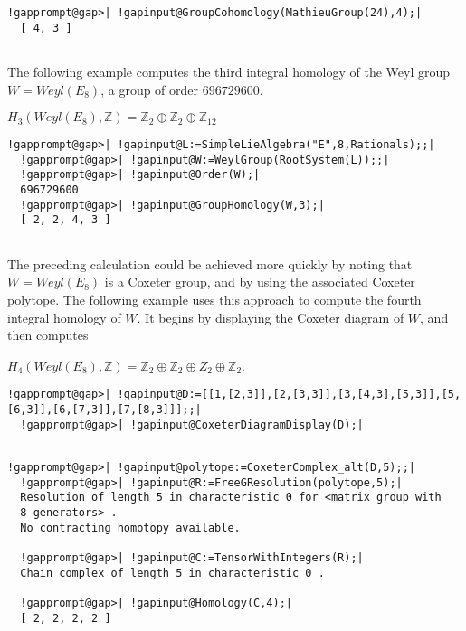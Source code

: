 \documentclass[a4paper,11pt]{report}
\begin{document}
{{\begin{Verbatim}[commandchars=!@|,fontsize=\small,frame=single,label=Example]
  !gapprompt@gap>| !gapinput@GroupCohomology(MathieuGroup(24),4);|
  [ 4, 3 ]
  
\end{Verbatim}
 

The following example computes the third integral homology of the Weyl group $W=Weyl(E_8)$, a group of order $696729600$. 

$H_3(Weyl(E_8),\mathbb Z) = \mathbb Z_2 \oplus \mathbb Z_2 \oplus \mathbb
Z_{12}$ 
\begin{Verbatim}[commandchars=!@|,fontsize=\small,frame=single,label=Example]
  !gapprompt@gap>| !gapinput@L:=SimpleLieAlgebra("E",8,Rationals);;|
  !gapprompt@gap>| !gapinput@W:=WeylGroup(RootSystem(L));;|
  !gapprompt@gap>| !gapinput@Order(W);|
  696729600
  !gapprompt@gap>| !gapinput@GroupHomology(W,3);|
  [ 2, 2, 4, 3 ]
  
\end{Verbatim}
 

The preceding calculation could be achieved more quickly by noting that $W=Weyl(E_8)$ is a Coxeter group, and by using the associated Coxeter polytope. The
following example uses this approach to compute the fourth integral homology
of $W$. It begins by displaying the Coxeter diagram of $W$, and then computes 

$H_4(Weyl(E_8),\mathbb Z) = \mathbb Z_2 \oplus \mathbb Z_2 \oplus Z_2 \oplus
\mathbb Z_2$. 
\begin{Verbatim}[commandchars=!@|,fontsize=\small,frame=single,label=Example]
  !gapprompt@gap>| !gapinput@D:=[[1,[2,3]],[2,[3,3]],[3,[4,3],[5,3]],[5,[6,3]],[6,[7,3]],[7,[8,3]]];;|
  !gapprompt@gap>| !gapinput@CoxeterDiagramDisplay(D);|
  
\end{Verbatim}
  
\begin{Verbatim}[commandchars=!@|,fontsize=\small,frame=single,label=Example]
  !gapprompt@gap>| !gapinput@polytope:=CoxeterComplex_alt(D,5);;|
  !gapprompt@gap>| !gapinput@R:=FreeGResolution(polytope,5);|
  Resolution of length 5 in characteristic 0 for <matrix group with 
  8 generators> . 
  No contracting homotopy available. 
  
  !gapprompt@gap>| !gapinput@C:=TensorWithIntegers(R);|
  Chain complex of length 5 in characteristic 0 . 
  
  !gapprompt@gap>| !gapinput@Homology(C,4);|
  [ 2, 2, 2, 2 ]
  
\end{Verbatim}
 

}}
\end{document}
